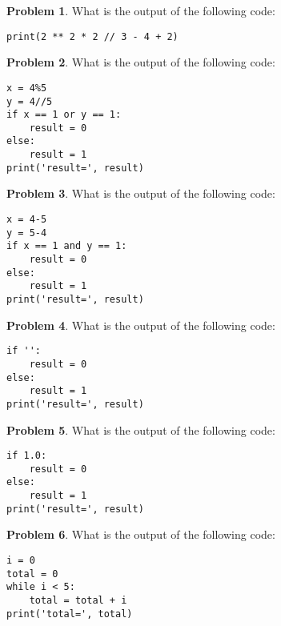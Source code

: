 \documentclass[10pt]{article}
\theoremstyle{definition}
\newtheorem{problem}{Problem}
\begin{document}
\begin{problem}
    What is the output of the following code:
\end{problem}
\begin{lstlisting}
print(2 ** 2 * 2 // 3 - 4 + 2)
\end{lstlisting}
\vspace{1.5in}

\begin{problem}
    What is the output of the following code:
\end{problem}
\begin{lstlisting}
x = 4%5
y = 4//5
if x == 1 or y == 1:
    result = 0
else:
    result = 1
print('result=', result)
\end{lstlisting}
\vspace{1.8in}

\begin{problem}
    What is the output of the following code:
\end{problem}
\begin{lstlisting}
x = 4-5
y = 5-4
if x == 1 and y == 1:
    result = 0
else:
    result = 1
print('result=', result)
\end{lstlisting}
\vspace{1.8in}

\begin{problem}
    What is the output of the following code:
\end{problem}
\begin{lstlisting}
if '':
    result = 0
else:
    result = 1
print('result=', result)
\end{lstlisting}
\vspace{1.8in}

\begin{problem}
    What is the output of the following code:
\end{problem}
\begin{lstlisting}
if 1.0:
    result = 0
else:
    result = 1
print('result=', result)
\end{lstlisting}
\vspace{1.8in}



\begin{problem}
    What is the output of the following code:
\end{problem}
\begin{lstlisting}
i = 0
total = 0
while i < 5:
    total = total + i
print('total=', total)
\end{lstlisting}
\vspace{1.8in}
\end{document}
